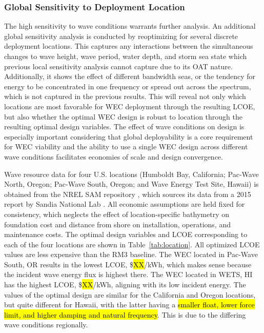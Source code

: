 
\subsubsection{Global Sensitivity to Deployment Location}
The high sensitivity to wave conditions warrants further analysis.
An additional global sensitivity analysis is conducted by reoptimizing for several discrete deployment locations.
This captures any interactions between the simultaneous changes to wave height, wave period, water depth, and storm sea state which previous local sensitivity analysis cannot capture due to its OAT nature.
Additionally, it shows the effect of different bandwidth seas, or the tendency for energy to be concentrated in one frequency or spread out across the spectrum, which is not captured in the previous results.
This will reveal not only which locations are most favorable for WEC deployment through the resulting LCOE, but also whether the optimal WEC design is robust to location through the resulting optimal design variables.
The effect of wave conditions on design is especially important considering that global deployability is a core requirement for WEC viability \cite{bull_systems_2017} and the ability to use a single WEC design across different wave conditions facilitates economies of scale and design convergence.

Wave resource data for four U.S. locations (Humboldt Bay, California; Pac-Wave North, Oregon; Pac-Wave South, Oregon; and Wave Energy Test Site, Hawaii) is obtained from the NREL SAM repository \cite{janzou_sam_2022}, which sources its data from a 2015 report by Sandia National Lab \cite{dallman_characterization_2015}.
All economic assumptions are held fixed for consistency, which neglects the effect of location-specific bathymetry on foundation cost and distance from shore on installation, operations, and maintenance costs.
The optimal design variables and LCOE corresponding to each of the four locations are shown in Table~\ref{tab:location}.
All optimized LCOE values are less expensive than the RM3 baseline.
The WEC located in Pac-Wave South, OR results in the lowest LCOE, \$\hl{XX}/kWh, which makes sense because the incident wave energy flux is highest there.
The WEC located in WETS, HI has the highest LCOE, \$\hl{XX}/kWh, aligning with its low incident energy.
The values of the optimal design are similar for the California and Oregon locations, but quite different for Hawaii, with the latter having a \hl{smaller float, lower force limit, and higher damping and natural frequency}.
This is due to the differing wave conditions regionally.

